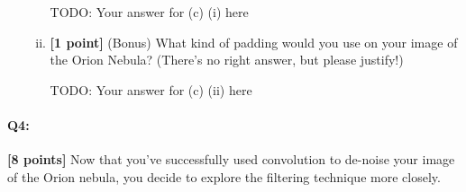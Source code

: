 \begin{enumerate}[(a)]
\begin{enumerate}[(i)]
    \begin{mdframed}
        TODO: Your answer for (c) (i) here
    \end{mdframed}

    \item \textbf{[1 point]} (Bonus) What kind of padding would you use on your image of the Orion Nebula? (There's no right answer, but please justify!)
    
    \begin{mdframed}
        TODO: Your answer for (c) (ii) here
    \end{mdframed}
\end{enumerate}

\end{enumerate}





\pagebreak
\paragraph{Q4:} \textbf{[8 points]} Now that you've successfully used convolution to de-noise your image of the Orion nebula, you decide to explore the filtering technique more closely. 

